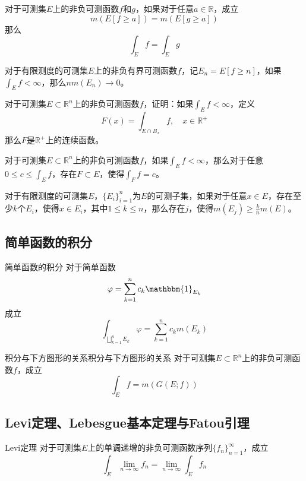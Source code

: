 \documentclass[lang = cn, scheme = chinese, thmcnt = section]{elegantbook}
\newcommand{\R}{\mathbb{R}}            %
\newcommand{\sub}{\subset}             %
\newcommand{\dis}{\displaystyle}
\begin{document}
\begin{exercise}
	对于可测集$E$上的非负可测函数$f$和$g$，如果对于任意$a\in\R$，成立
	$$
	m(E[f\ge a])=m(E[g\ge a])
	$$
	那么
	$$
	\int_E f=\int_E g
	$$
\end{exercise}

\begin{exercise}
	对于有限测度的可测集$E$上的非负有界可测函数$f$，记$E_n=E[f\ge n]$，如果$\displaystyle\int_Ef<\infty$，那么$nm(E_n)\to0$。
\end{exercise}

\begin{exercise}
	对于可测集$E\sub\R^n$上的非负可测函数$f$，证明：如果$\int_Ef<\infty$，定义
	$$
	F(x)=\int_{E\cap B_x}f,\quad x\in\R^+
	$$
	那么$F$是$\R^+$上的连续函数。
\end{exercise}

\begin{exercise}
	对于可测集$E\sub\R^n$上的非负可测函数$f$，如果$\dis\int_Ef<\infty$，那么对于任意$\dis0\le c \le \int_Ef$，存在$F\sub E$，使得$\dis\int_F f=c$。
\end{exercise}

\begin{exercise}
	对于有限测度的可测集$E$，$\{ E_i \}_{i=1}^{n}$为$E$的可测子集，如果对于任意$x\in E$，存在至少$k$个$E_i$，使得$x\in E_i$，其中$1\le k \le n$，那么存在$j$，使得$m(E_j)\ge \frac{k}{n}m(E)$。
\end{exercise}

\subsection{简单函数的积分}

\begin{theorem}{简单函数的积分}
	对于简单函数
	$$
	\varphi=\sum_{k=1}^{n}{c_k\mathbbm{1}_{E_k}}
	$$
	成立
	$$
	\int_{\bigsqcup\limits_{k=1}^{n} E_k} \varphi=\sum_{k=1}^{n}c_km(E_k)
	$$
\end{theorem}

\begin{theorem}{积分与下方图形的关系}{积分与下方图形的关系}
	对于可测集$E\sub\R^n$上的非负可测函数$f$，成立
	$$
	\int_E f=m(G(E;f))
	$$
\end{theorem}

\subsection{Levi定理、Lebesgue基本定理与Fatou引理}

\begin{theorem}{Levi定理}
	对于可测集$E$上的单调递增的非负可测函数序列$\{ f_n \}_{n=1}^{\infty}$，成立
	$$
	\int_E\lim_{n\to\infty}f_n=\lim_{n\to\infty}\int_Ef_n
	$$
\end{theorem}
\end{document}
